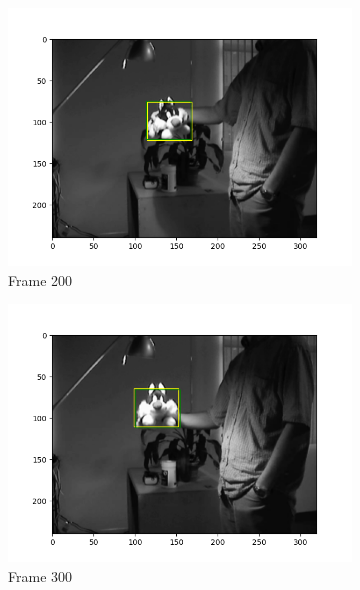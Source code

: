 \documentclass{article} %
\begin{document}
\begin{figure}[H]
\begin{subfigure}[b]{0.30\textwidth}
        \end{subfigure}
        \begin{subfigure}[b]{0.30\textwidth}
            \centering
            \includegraphics[width=\textwidth]{q2,3_frame200.png}
            \caption{Frame 200}
        \end{subfigure}
        \begin{subfigure}[b]{0.30\textwidth}
            \centering
            \includegraphics[width=\textwidth]{q2,3_frame300.png}
            \caption{Frame 300}
        \end{subfigure}
        \begin{subfigure}[b]{0.30\textwidth}
            \centering

\end{subfigure}
\end{figure}
\end{document}
